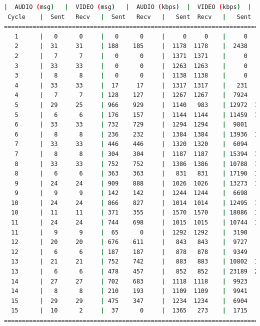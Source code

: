 \begin{lstlisting}[language=bash,basicstyle=\ttfamily\scriptsize]
          |  AUDIO (msg)   |  VIDEO (msg)   |  AUDIO (kbps)  |  VIDEO (kbps)  |   CPU (%)
 Cycle    |  Sent   Recv   |  Sent   Recv   |   Sent  Recv   |   Sent  Recv   | Program System
============================================================================================
   1      |   0      0     |   0      0     |     0     0    |     0     0    |   0      0
   2      |  31     31     | 188    185     |  1178  1178    |  2438   2402   |  27     67
   2      |   7      7     |   0      0     |  1371  1371    |     0      0   |  53     69
   3      |  33     33     |   0      0     |  1263  1263    |     0      0   |  30     73
   3      |   8      8     |   0      0     |  1138  1138    |     0      0   |  43     75
   4      |  33     33     |  17     17     |  1317  1317    |   231    228   |  51     77
   4      |   7      7     | 128    127     |  1267  1267    |  7924   7862   |  27     76
   5      |  29     25     | 966    929     |  1140   983    | 12972  12474   |  31     74
   5      |   6      6     | 176    157     |  1144  1144    | 11459  10235   |  46     74
   6      |  33     33     | 732    729     |  1294  1294    |  9801   9761   |  27     79
   6      |   8      8     | 236    232     |  1384  1384    | 13936  13700   |  36     78
   7      |  33     33     | 446    446     |  1320  1320    |  6094   6094   |  21     74
   7      |   8      8     | 304    304     |  1187  1187    | 15394  15394   |  18     75
   8      |  33     33     | 752    752     |  1386  1386    | 10788  10788   |  41     76
   8      |   6      6     | 363    363     |   831   831    | 17190  17168   |  25     77
   9      |  24     24     | 909    888     |  1026  1026    | 13273  12969   |  32     79
   9      |   9      9     | 142    142     |  1244  1244    |  6698   6698   |  42     76
  10      |  24     24     | 866    827     |  1014  1014    | 12495  11935   |  41     75
  10      |  11     11     | 371    355     |  1570  1570    | 18086  17305   |  30     76
  11      |  24     24     | 744    698     |  1015  1015    | 10744  10082   |  29     73
  11      |   9      9     |  65      0     |  1292  1292    |  3190      0   |  43     72
  12      |  20     20     | 676    611     |   843   843    |  9727   8794   |  24     73
  12      |   6      6     | 187    187     |   878   878    |  9349   9349   |  22     74
  13      |  21     21     | 752    742     |   883   883    | 10802  10658   |  28     76
  13      |   6      6     | 478    457     |   852   852    | 23189  22158   |  26     76
  14      |  27     27     | 702    683     |  1118  1118    |  9923   9654   |  37     73
  14      |   8      8     | 210    193     |  1109  1109    |  9941   9135   |  29     73
  15      |  29     29     | 475    347     |  1234  1234    |  6904   5045   |  35     70
  15      |  10      2     |  37      0     |  1365   273    |  1715      0   |  37     70
============================================================================================
\end{lstlisting}


